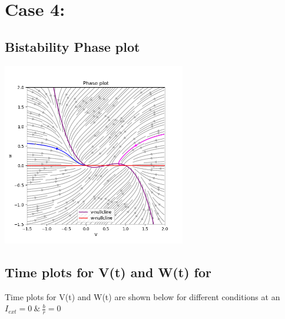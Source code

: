 \documentclass[a4paper, 12pt]{article}
\begin{document}
\vspace{2em}
\noindent


\section{Case 4: }
\label{case_4}

\subsection{Bistability Phase plot}

\begin{minipage}{\linewidth}
    \centering
    \includegraphics[width=0.60\textwidth]{Q4_a}
    \label{fig:Q4_a}
\end{minipage}

\subsection{Time plots for V(t) and W(t) for  }
Time plots for V(t) and W(t) are shown below for different conditions at an $ I_{ext} = 0 ~ \& ~ \frac{b}{r} = 0 $ 

\subsubsection{}
\end{document}
